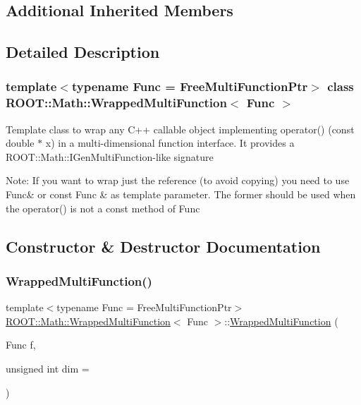 \subsection*{Additional Inherited Members}


\subsection{Detailed Description}
\subsubsection*{template$<$typename Func = Free\+Multi\+Function\+Ptr$>$\newline
class R\+O\+O\+T\+::\+Math\+::\+Wrapped\+Multi\+Function$<$ Func $>$}

Template class to wrap any C++ callable object implementing operator() (const double $\ast$ x) in a multi-\/dimensional function interface. It provides a R\+O\+O\+T\+::\+Math\+::\+I\+Gen\+Multi\+Function-\/like signature

Note\+: If you want to wrap just the reference (to avoid copying) you need to use Func\& or const Func \& as template parameter. The former should be used when the operator() is not a const method of Func 

\subsection{Constructor \& Destructor Documentation}
\mbox{\label{classROOT_1_1Math_1_1WrappedMultiFunction_a015f33dec6c241c6b5662df06ea4ddb9}} 
\subsubsection{\texorpdfstring{WrappedMultiFunction()}{WrappedMultiFunction()}\hspace{0.1cm}{\footnotesize\ttfamily [1/3]}}
{\footnotesize\ttfamily template$<$typename Func  = Free\+Multi\+Function\+Ptr$>$ \\
\mbox{\hyperlink{classROOT_1_1Math_1_1WrappedMultiFunction}{R\+O\+O\+T\+::\+Math\+::\+Wrapped\+Multi\+Function}}$<$ Func $>$\+::\mbox{\hyperlink{classROOT_1_1Math_1_1WrappedMultiFunction}{Wrapped\+Multi\+Function}} (\begin{DoxyParamCaption}\item[{Func}]{f,  }\item[{unsigned int}]{dim = {} }\end{DoxyParamCaption})\hspace{0.3cm}{\ttfamily [inline]}}

